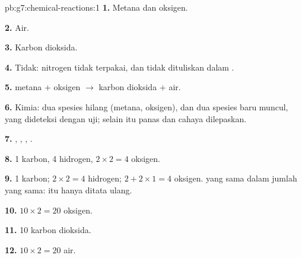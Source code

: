 \begin{solution}{pb:g7:chemical-reactions:1}
\textbf{1.} Metana dan oksigen.

\textbf{2.} Air.

\textbf{3.} Karbon dioksida.

\textbf{4.} Tidak: nitrogen tidak terpakai, dan tidak dituliskan dalam
.

\textbf{5.} metana $+$ oksigen $\longrightarrow$ karbon dioksida $+$
air.

\textbf{6.} Kimia: dua spesies hilang (metana, oksigen), dan dua spesies
baru muncul, yang dideteksi dengan uji; selain itu panas dan cahaya
dilepaskan.

\textbf{7.} , , , .

\textbf{8.} 1 karbon, 4 hidrogen, $2 \times 2 = 4$ oksigen.

\textbf{9.} 1 karbon; $2 \times 2 = 4$ hidrogen; $2 + 2 \times 1 = 4$
oksigen.  yang sama dalam jumlah yang sama:  itu hanya
ditata ulang.

\textbf{10.} $10 \times 2 = 20$  oksigen.

\textbf{11.} 10  karbon dioksida.

\textbf{12.} $10 \times 2 = 20$  air.
\end{solution}
